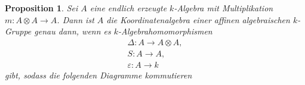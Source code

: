 \documentclass[a4paper, 11pt]{scrartcl}
\newcommand{\id}{\text{id}}
\theoremstyle{basicstyle}
\newtheorem{proposition}[definition]{Proposition}
\begin{document}
    \begin{proposition}\label{prop:1}
        Sei \(A\) eine endlich erzeugte \(k\)-Algebra mit Multiplikation \(m: A \otimes A \to A\).
        Dann ist \(A\) die Koordinatenalgebra einer affinen algebraischen \(k\)-Gruppe genau dann, wenn es \(k\)-Algebrahomomorphismen
        \begin{gather*}
            \Delta: A \longrightarrow A \otimes A, \\
            S: A \longrightarrow A, \\
            \varepsilon: A \longrightarrow k
        \end{gather*}
        gibt, sodass die folgenden Diagramme kommutieren
        \begin{figure*}[ht!]
            \centering
        \end{figure*}
        \begin{figure*}[ht!]
            \centering
            \hspace*{4em}
        \end{figure*}
        \begin{figure*}[ht!]
            \centering
            \hspace*{4em}
        \end{figure*}
    \end{proposition}
\end{document}
